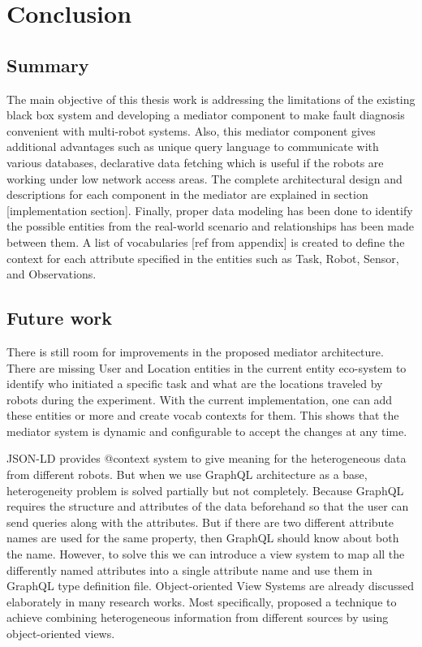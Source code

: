 

	\let\cleardoublepage\clearpage
\chapter{Conclusion}

\section{Summary}

The main objective of this thesis work is addressing the limitations of the existing black box system and developing a mediator component to make fault diagnosis convenient with multi-robot systems. Also, this mediator component gives additional advantages such as unique query language to communicate with various databases, declarative data fetching which is useful if the robots are working under low network access areas. The complete architectural design and descriptions for each component in the mediator are explained in section [implementation section]. Finally, proper data modeling has been done to identify the possible entities from the real-world scenario and relationships has been made between them. A list of vocabularies [ref from appendix] is created to define the context for each attribute specified in the entities such as Task, Robot, Sensor, and Observations.

\section{Future work}
There is still room for improvements in the proposed mediator architecture. 
There are missing User and Location entities in the current entity eco-system to identify who initiated a specific task and what are the locations traveled by robots during the experiment.  With the current implementation, one can add these entities or more and create vocab contexts for them. This shows that the mediator system is dynamic and configurable to accept the changes at any time.

JSON-LD provides @context system to give meaning for the heterogeneous data from different robots. But when we use GraphQL architecture as a base, heterogeneity problem is solved partially but not completely. Because GraphQL requires the structure and attributes of the data beforehand so that the user can send queries along with the attributes. But if there are two different attribute names are used for the same property, then GraphQL should know about both the name. However, to solve this we can introduce a view system to map all the differently named attributes into a single attribute name and use them in GraphQL type definition file. Object-oriented View Systems are already discussed elaborately in many research works. Most specifically, \citet{kaul1990viewsystem} proposed a technique to achieve combining heterogeneous information from different sources by using object-oriented views.


